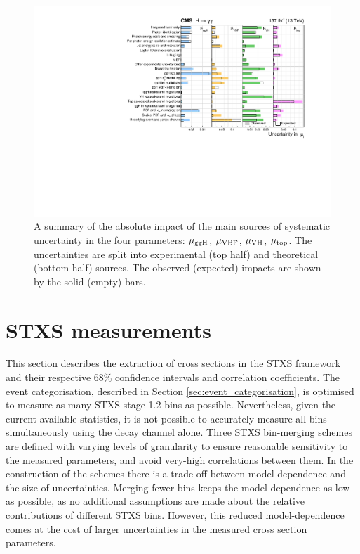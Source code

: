 \begin{figure}
  \centering
  \includegraphics[width=1\textwidth]{Figures/hgg_results/mu_systematics.pdf}
  \caption[Impact of systematic uncertainty sources on the per-production mode signal-strengths]
  {
    A summary of the absolute impact of the main sources of systematic uncertainty in the four parameters: $\mu_{\rm{ggH}}$, $\mu_{\rm{VBF}}$, $\mu_{\rm{VH}}$, $\mu_{\rm{top}}$. The uncertainties are split into experimental (top half) and theoretical (bottom half) sources. The observed (expected) impacts are shown by the solid (empty) bars.
  }
  \label{fig:syst_mu}
\end{figure}

\FloatBarrier
\section{STXS measurements}\label{sec:results_STXS}
This section describes the extraction of cross sections in the STXS framework and their respective 68\% confidence intervals and correlation coefficients. The event categorisation, described in Section \ref{sec:event_categorisation}, is optimised to measure as many STXS stage 1.2 bins as possible. Nevertheless, given the current available statistics, it is not possible to accurately measure all bins simultaneously using the \Hgg decay channel alone. Three STXS bin-merging schemes are defined with varying levels of granularity to ensure reasonable sensitivity to the measured parameters, and avoid very-high correlations between them. In the construction of the schemes there is a trade-off between model-dependence and the size of uncertainties. Merging fewer bins keeps the model-dependence as low as possible, as no additional assumptions are made about the relative contributions of different STXS bins. However, this reduced model-dependence comes at the cost of larger uncertainties in the measured cross section parameters.

